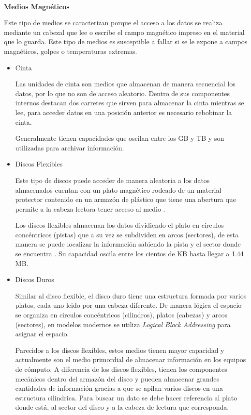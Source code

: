 \textbf{\\ Medios Magn\'{e}ticos \\}

Este tipo de medios se caracterizan porque el acceso a los datos se realiza mediante un cabezal que lee o escribe el campo magn\'{e}tico impreso en el material que lo guarda. Este tipo de medios es susceptible a fallar si se le expone a campos magn\'{e}ticos, golpes o temperaturas extremas.

\begin{itemize}

  \item Cinta
  
  Las unidades de cinta son medios que almacenan de manera secuencial los datos, por lo que no son de acceso aleatorio. Dentro de sus componentes internos destacan dos carretes que sirven para almacenar la cinta mientras se lee, para acceder datos en una posici\'{o}n anterior es necesario rebobinar la cinta.
  
  Generalmente tienen capacidades que oscilan entre los GB y TB  \cite{b306cc575a86d1e84e6ba100dcfb4417} y son utilizadas para archivar informaci\'{o}n.
  
  \item Discos Flexibles
  
  Este tipo de discos puede acceder de manera aleatoria a los datos almacenados cuentan con un plato magn\'{e}tico rodeado de un material protector contenido en un armaz\'{o}n de pl\'{a}stico que tiene una abertura que permite a la cabeza lectora tener acceso al medio \cite{09678f37a2afcca35133d9a7306744b4}.
  
  Los discos flexibles almacenan los datos dividiendo el plato en circulos conc\'{e}ntricos (pistas) que a su vez se subdividen en arcos (sectores), de esta manera se puede localizar la informaci\'{o}n sabiendo la pista y el sector donde se encuentra \cite{04667739f34ceed8672133b51ada8a35}. Su capacidad oscila entre los cientos de KB hasta llegar a 1.44 MB.
  
  \item Discos Duros
  
  Similar al disco flexible, el disco duro tiene una estructura formada por varios platos, cada uno leido por una cabeza diferente. De manera l\'{o}gica el espacio se organiza en circulos conc\'{e}ntricos (cilindros), platos (cabezas) y arcos (sectores), en modelos modernos se utiliza \emph{Logical Block Addressing} para asignar el espacio.
  
  Parecidos a los discos flexibles, estos medios tienen mayor capacidad y actualmente son el medio primordial de almacenar informaci\'{o}n en los equipos de c\'{o}mputo. A diferencia de los discos flexibles, tienen los componentes mec\'{a}nicos dentro del armaz\'{o}n del disco y pueden almacenar grandes cantidades de informaci\'{o}n gracias a que se apilan varios discos en una estructura cilindrica. Para buscar un dato se debe hacer referencia al plato donde est\'{a}, al sector del disco y a la cabeza de lectura que corresponda.
  
\end{itemize}

